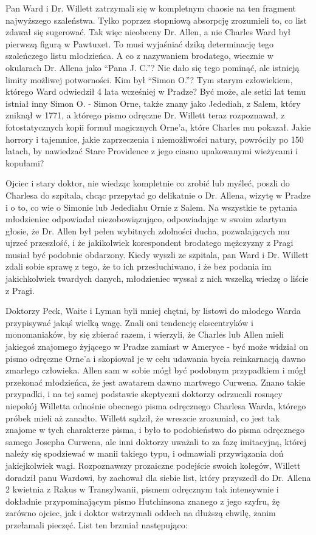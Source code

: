 Pan Ward i Dr. Willett zatrzymali się w kompletnym chaosie na ten fragment najwyższego szaleństwa. Tylko poprzez stopniową absorpcję zrozumieli to, co list zdawał się sugerować. Tak więc nieobecny Dr. Allen, a nie Charles Ward był pierwszą figurą w Pawtuxet. To musi wyjaśniać dziką determinację tego szaleńczego listu młodzieńca. A co z nazywaniem brodatego, wiecznie w okularach Dr. Allena jako ``Pana J. C.''? Nie dało się tego pominąć, ale istnieją limity możliwej potworności. Kim był ``Simon O.''? Tym starym człowiekiem, którego Ward odwiedził 4 lata wcześniej w Pradze? Być może, ale setki lat temu istniał inny Simon O. - Simon Orne, także znany jako Jedediah, z Salem, który zniknął w 1771, a którego pismo odręczne Dr. Willett teraz rozpoznawał, z fotostatycznych kopii formuł magicznych Orne'a, które Charles mu pokazał. Jakie horrory i tajemnice, jakie zaprzeczenia i niemożliwości natury, powróciły po 150 latach, by nawiedzać Stare Providence z jego ciasno upakowanymi wieżycami i kopułami?

Ojciec i stary doktor, nie wiedząc kompletnie co zrobić lub myśleć, poszli do Charlesa do szpitala, chcąc przepytać go delikatnie o Dr. Allena, wizytę w Pradze i o to, co wie o Simonie lub Jedediahu Ornie z Salem. Na wszystkie te pytania młodzieniec odpowiadał niezobowiązująco, odpowiadając w swoim zdartym głosie, że Dr. Allen był pełen wybitnych zdolności ducha, pozwalających mu ujrzeć przeszłość, i że jakikolwiek korespondent brodatego mężczyzny z Pragi musiał być podobnie obdarzony. Kiedy wyszli ze szpitala, pan Ward i Dr. Willett zdali sobie sprawę z tego, że to ich przesłuchiwano, i że bez podania im jakichkolwiek twardych danych, młodzieniec wyssał z nich wszelką wiedzę o liście z Pragi.

Doktorzy Peck, Waite i Lyman byli mniej chętni, by listowi do młodego Warda przypisywać jakąś wielką wagę. Znali oni tendencję ekscentryków i monomaniaków, by się zbierać razem, i wierzyli, że Charles lub Allen mieli jakiegoś znajomego żyjącego w Pradze zamiast w Ameryce - być może widział on pismo odręczne Orne'a i skopiował je w celu udawania bycia reinkarnacją dawno zmarłego człowieka. Allen sam w sobie mógł być podobnym przypadkiem i mógł przekonać młodzieńca, że jest awatarem dawno martwego Curwena. Znano takie przypadki, i na tej samej podstawie skeptyczni doktorzy odrzucali rosnący niepokój Willetta odnośnie obecnego pisma odręcznego Charlesa Warda, którego próbek mieli aż zanadto. Willett sądził, że wreszcie zrozumiał, co jest tak znajome w tych charakterze pisma, i było to podobieństwo do pisma odręcznego samego Josepha Curwena, ale inni doktorzy uważali to za fazę imitacyjną, której należy się spodziewać w manii takiego typu, i odmawiali przywiązania doń jakiejkolwiek wagi. Rozpoznawszy prozaiczne podejście swoich kolegów, Willett doradził panu Wardowi, by zachował dla siebie list, który przyszedł do Dr. Allena 2 kwietnia z Rakus w Transylwanii, pismem odręcznym tak intensywnie i dokładnie przypominającym pismo Hutchinsona znanego z jego szyfru, żę zarówno ojciec, jak i doktor wstrzymali oddech na dłuższą chwilę, zanim przełamali pieczęć. List ten brzmiał następująco:  


